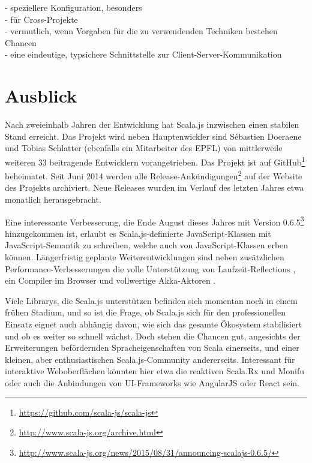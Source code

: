 \documentclass[a4paper, 12pt, hidelinks, listof=totoc, listoftables=totoc, bibliography=totoc]{scrreprt}
\begin{document}
- speziellere Konfiguration, besonders \\
  - für Cross-Projekte \\
  - vermutlich, wenn Vorgaben für die zu verwendenden Techniken bestehen \\

Chancen \\

- eine eindeutige, typsichere Schnittstelle zur Client-Server-Kommunikation \\





\section{Ausblick}

Nach zweieinhalb Jahren der Entwicklung hat Scala.js inzwischen einen stabilen Stand erreicht. Das Projekt wird neben Hauptenwickler sind Sébastien Doeraene und Tobias Schlatter (ebenfalls ein Mitarbeiter des \ac{EPFL}) von mittlerweile weiteren 33 beitragende Entwicklern vorangetrieben. Das Projekt ist auf GitHub\footnote{\url{https://github.com/scala-js/scala-js}} beheimatet. Seit Juni 2014 werden alle Release-Ankündigungen\footnote{\url{http://www.scala-js.org/archive.html}} auf der Website des Projekts archiviert. Neue Releases wurden im Verlauf des letzten Jahres etwa monatlich herausgebracht.

Eine interessante Verbesserung, die Ende August dieses Jahres mit Version 0.6.5\footnote{\url{http://www.scala-js.org/news/2015/08/31/announcing-scalajs-0.6.5/}} hinzugekommen ist, erlaubt es Scala.js-definierte JavaScript-Klassen mit JavaScript-Semantik zu schreiben, welche auch von JavaScript-Klassen erben können. Längerfristig geplante Weiterentwicklungen sind neben zusätzlichen Performance-Verbesserungen die volle Unterstützung von Laufzeit-Reflections \cite[S. 2]{doeraene2013.TDI}, ein Compiler im Browser \cite[Folie 39, Min. 39]{doeraene2014.WHB} und vollwertige Akka-Aktoren \cite[Folie 39, Min. 39]{doeraene2014.WHB}.

Viele Librarys, die Scala.js unterstützen befinden sich momentan noch in einem frühen Stadium, und so ist die Frage, ob Scala.js sich für den professionellen Einsatz eignet auch abhängig davon, wie sich das gesamte Ökosystem stabilisiert und ob es weiter so schnell wächst. Doch stehen die Chancen gut, angesichts der Erweiterungen befördernden Spracheigenschaften von Scala einerseits, und einer kleinen, aber enthusiastischen Scala.js-Community andererseits. Interessant für interaktive Weboberflächen könnten hier etwa die reaktiven Scala.Rx und Monifu oder auch die Anbindungen von UI-Frameworks wie AngularJS oder React sein.
\end{document}
